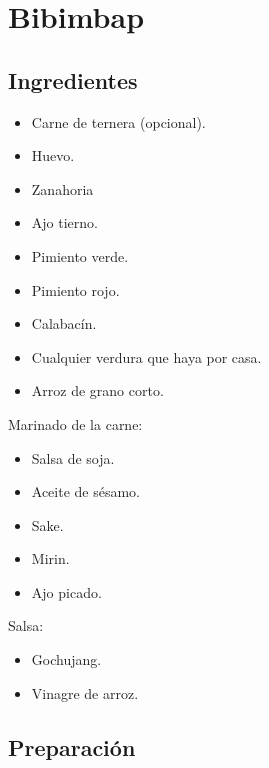 \documentclass[
]{book}
\providecommand{\tightlist}{%
  \setlength{\itemsep}{0pt}\setlength{\parskip}{0pt}}
\begin{document}
\hypertarget{bibimbap}{%
\chapter{Bibimbap}\label{bibimbap}}

\hypertarget{ingredientes-5}{%
\section*{Ingredientes}\label{ingredientes-5}}

\begin{itemize}
\tightlist
\item
  Carne de ternera (opcional).
\item
  Huevo.
\item
  Zanahoria
\item
  Ajo tierno.
\item
  Pimiento verde.
\item
  Pimiento rojo.
\item
  Calabacín.
\item
  Cualquier verdura que haya por casa.
\item
  Arroz de grano corto.
\end{itemize}

Marinado de la carne:

\begin{itemize}
\tightlist
\item
  Salsa de soja.
\item
  Aceite de sésamo.
\item
  Sake.
\item
  Mirin.
\item
  Ajo picado.
\end{itemize}

Salsa:

\begin{itemize}
\tightlist
\item
  Gochujang.
\item
  Vinagre de arroz.
\end{itemize}

\hypertarget{preparaciuxf3n-5}{%
\section*{Preparación}\label{preparaciuxf3n-5}}
\end{document}
